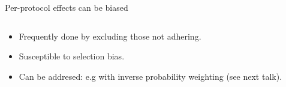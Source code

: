 \documentclass{beamer}
\begin{document}
    \begin{frame}{Per-protocol effects can be biased}
        \begin{columns}
            \begin{column}{0.4\textwidth} 
        \begin{itemize}
            \item Frequently done by excluding those not adhering.\footnotemark[1]
            \item Susceptible to selection bias.
            \item[\ding{43}] Can be addresed: e.g with inverse probability weighting (see next talk). 
        \end{itemize}
    \end{column}

    \begin{column}{0.6\textwidth}   
         \begin{center}
\end{center}
\end{column}
\end{columns}
\end{frame}
\end{document}
